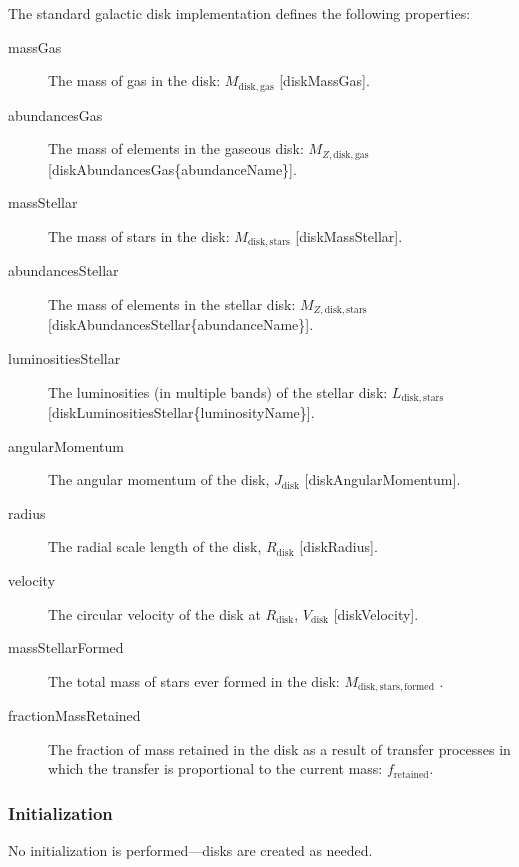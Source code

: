 The standard galactic disk implementation defines the following properties:
\begin{description}
 \item [{\normalfont \ttfamily massGas}] The mass of gas in the disk: $M_\mathrm{disk, gas}$ [{\normalfont \ttfamily diskMassGas}].
 \item [{\normalfont \ttfamily abundancesGas}] The mass of elements in the gaseous disk: $M_{Z, \mathrm{disk, gas}}$ [{\normalfont \ttfamily diskAbundancesGas\{abundanceName\}}].
 \item [{\normalfont \ttfamily massStellar}] The mass of stars in the disk: $M_\mathrm{disk, stars}$ [{\normalfont \ttfamily diskMassStellar}].
 \item [{\normalfont \ttfamily abundancesStellar}] The mass of elements in the stellar disk: $M_{Z, \mathrm{disk, stars}}$ [{\normalfont \ttfamily diskAbundancesStellar\{abundanceName\}}].
 \item [{\normalfont \ttfamily luminositiesStellar}] The luminosities (in multiple bands) of the stellar disk: $L_\mathrm{disk, stars}$ [{\normalfont \ttfamily diskLuminositiesStellar\{luminosityName\}}].
 \item [{\normalfont \ttfamily angularMomentum}] The angular momentum of the disk, $J_\mathrm{disk}$ [{\normalfont \ttfamily diskAngularMomentum}].
 \item [{\normalfont \ttfamily radius}] The radial scale length of the disk, $R_\mathrm{disk}$ [{\normalfont \ttfamily diskRadius}].
 \item [{\normalfont \ttfamily velocity}] The circular velocity of the disk at $R_\mathrm{disk}$, $V_\mathrm{disk}$ [{\normalfont \ttfamily diskVelocity}].
 \item [{\normalfont \ttfamily massStellarFormed}] The total mass of stars ever formed in the disk: $M_\mathrm{disk, stars, formed}$ .
 \item [{\normalfont \ttfamily fractionMassRetained}] The fraction of mass retained in the disk as a result of transfer processes in which the transfer is proportional to the current mass: $f_\mathrm{retained}$.
\end{description}

\subsubsection{Initialization}

No initialization is performed---disks are created as needed.


